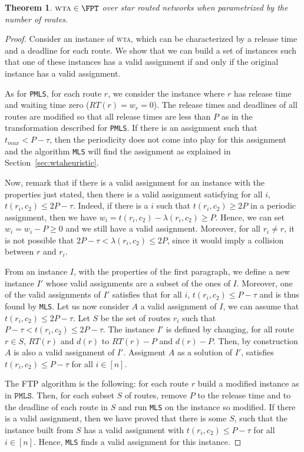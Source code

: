 \documentclass[a4paper,10pt]{article}
\newcommand\MLS{\texttt{MLS}\xspace}
\newcommand\PMLS{\texttt{PMLS}\xspace}
\newtheorem{theorem}{Theorem}
\newcommand\wta{\textsc{wta}\xspace}
\begin{document}
\begin{theorem}\label{th:braFPT}
$\wta \in \FPT$ over star routed networks when parametrized by the number of routes.
\end{theorem}
\begin{proof}
 Consider an instance of \wta, which can be characterized by a release time and a deadline for each route.
 We show that we can build a set of instances such that one of these instances has a valid assignment if and only if the original instance has a valid assignment.

  As for \PMLS, for each route $r$, we consider the instance where $r$ has release time and waiting time zero ($RT(r) = w_r = 0$). The release times and deadlines of all routes are modified so that all release times are less than $P$ as in the transformation described for \PMLS. If there is an assignment such that $t_{max} < P-\tau$, then the periodicity does not come into play for this assignment and the algorithm \MLS will find the assignment as explained in Section~\ref{sec:wtaheuristic}.

 Now, remark that if there is a valid assignment for an instance with the properties just stated,
 then there is a valid assignment satisfying for all $i$, $t(r_i,c_2) \leq 2P - \tau$.  
 Indeed, if there is a $i$ such that $t(r_i,c_2) \geq 2P$ in a periodic assignment, then we have 
 $w_i = t(r_i,c_2) - \lambda(r_i,c_2) \geq P$. Hence, we can set $w_i = w_i -P \geq 0$ and we still have 
 a valid assignment. Moreover, for all $r_i \neq r$, it is not possible that $2P-\tau < \lambda(r_i,c_2) \leq 2P$, since it would imply a collision between $r$ and $r_i$.
 

From an instance $I$, with the properties of the first paragraph, we define a new instance $I'$ whose valid assignments are a subset of the ones of $I$. Moreover, one of the valid assignments of $I'$ satisfies that for all $i$, $t(r_i,c_2) \leq P - \tau$ and is thus found by \MLS. 
Let us now consider $A$ a valid assignment of $I$, we can assume that $t(r_i,c_2) \leq 2P - \tau$. Let $S$ be the set of routes $r_i$ such that  $P - \tau < t(r_i,c_2) \leq 2P - \tau$. The instance $I'$ is defined by changing, for all route $r \in S$, $RT(r)$ and $d(r)$ to $RT(r) - P$ and $d(r) - P$. Then, by construction $A$ is also a valid assignment of $I'$. Assigment $A$ as a solution of $I'$, satisfies $t(r_i,c_2) \leq P - \tau$ for all $i\in [n]$. 

The FTP algorithm is the following: for each route $r$ build a modified instance as in $\PMLS$.
Then, for each subset $S$ of routes, remove $P$ to the release time and to the deadline of each route in $S$ and run \MLS on the instance so modified. If there is a valid assignment, then we have proved that there is some $S$, such that the instance built from $S$ has a valid assignment with $t(r_i,c_2) \leq P - \tau$ for all $i\in [n]$. Hence, \MLS finds a valid assignment for this instance.
\end{proof}
\end{document}
